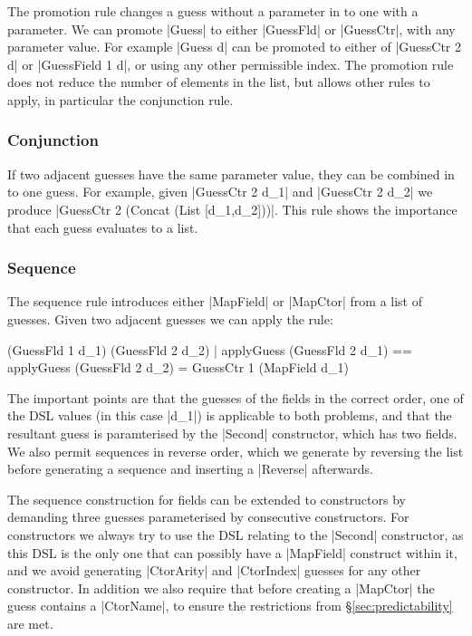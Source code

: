 \documentclass[preprint,draft]{sigplanconf}
\begin{document}
The promotion rule changes a guess without a parameter in to one with a parameter. We can promote |Guess| to either |GuessFld| or |GuessCtr|, with any parameter value. For example |Guess d| can be promoted to either of |GuessCtr 2 d| or |GuessField 1 d|, or using any other permissible index. The promotion rule does not reduce the number of elements in the list, but allows other rules to apply, in particular the conjunction rule.

\subsubsection{Conjunction}

If two adjacent guesses have the same parameter value, they can be combined in to one guess. For example, given |GuessCtr 2 d_1| and |GuessCtr 2 d_2| we produce |GuessCtr 2 (Concat (List [d_1,d_2]))|. This rule shows the importance that each guess evaluates to a list.

\subsubsection{Sequence}
\label{sec:guess_lists_sequence}

The sequence rule introduces either |MapField| or |MapCtor| from a list of guesses. Given two adjacent guesses we can apply the rule:

\begin{code}
(GuessFld 1 d_1) (GuessFld 2 d_2)
    | applyGuess (GuessFld 2 d_1) == applyGuess (GuessFld 2 d_2)
    = GuessCtr 1 (MapField d_1)
\end{code}

The important points are that the guesses of the fields in the correct order, one of the DSL values (in this case |d_1|) is applicable to both problems, and that the resultant guess is paramterised by the |Second| constructor, which has two fields. We also permit sequences in reverse order, which we generate by reversing the list before generating a sequence and inserting a |Reverse| afterwards.

The sequence construction for fields can be extended to constructors by demanding three guesses parameterised by consecutive constructors. For constructors we always try to use the DSL relating to the |Second| constructor, as this DSL is the only one that can possibly have a |MapField| construct within it, and we avoid generating |CtorArity| and |CtorIndex| guesses for any other constructor. In addition we also require that before creating a |MapCtor| the guess contains a |CtorName|, to ensure the restrictions from \S\ref{sec:predictability} are met.
\end{document}
